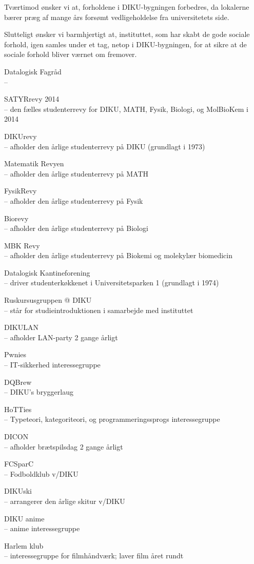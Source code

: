 \documentclass[a4paper]{article}
\begin{document}
Tværtimod ønsker vi at, forholdene i DIKU-bygningen forbedres, da
lokalerne bærer præg af mange års forsømt vedligeholdelse fra
universitetets side.

Slutteligt ønsker vi barmhjertigt at, instituttet, som har skabt de gode
sociale forhold, igen samles under et tag, netop i DIKU-bygningen, for at sikre
at de sociale forhold bliver værnet om fremover.

\rhead{}%

\begin{flushright}

\footnotesize\sffamily\itshape

Datalogisk Fagråd \\
--

SATYRrevy 2014 \\
-- den fælles studenterrevy for DIKU, MATH, Fysik, Biologi, og MolBioKem i 2014

DIKUrevy \\
-- afholder den årlige studenterrevy på DIKU (grundlagt i 1973)

Matematik Revyen \\
-- afholder den årlige studenterrevy på MATH

FysikRevy \\
-- afholder den årlige studenterrevy på Fysik

Biorevy \\
-- afholder den årlige studenterrevy på Biologi

MBK Revy \\
-- afholder den årlige studenterrevy på Biokemi og molekylær biomedicin

Datalogisk Kantineforening \\
-- driver studenterkøkkenet i Universitetsparken 1 (grundlagt i 1974)

Ruskursusgruppen @ DIKU \\
-- står for studieintroduktionen i samarbejde med instituttet

DIKULAN \\
-- afholder LAN-party 2 gange årligt

Pwnies \\
-- IT-sikkerhed interessegruppe

DQBrew \\
-- DIKU's bryggerlaug

HoTTies \\
-- Typeteori, kategoriteori, og programmeringssprogs interessegruppe

DICON \\
-- afholder brætspilsdag 2 gange årligt

FCSparC \\
-- Fodboldklub v/DIKU

DIKUski \\
-- arrangerer den årlige skitur v/DIKU

DIKU anime \\
-- anime interessegruppe

Harlem klub \\
-- interessegruppe for filmhåndværk;  laver film året rundt

\end{flushright}
\end{document}
